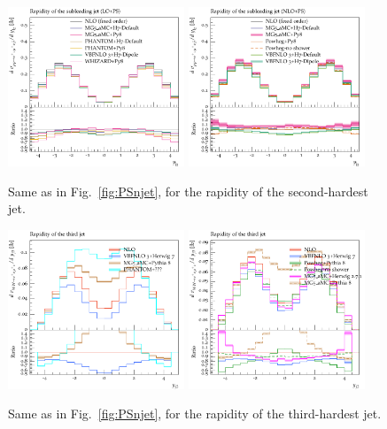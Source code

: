 \begin{figure}[hbt]
\centering
\includegraphics[width=0.47\textwidth]{figures/LOPS/y_j2.pdf}
\includegraphics[width=0.47\textwidth]{figures/NLOPS/y_j2.pdf}
\caption{Same as in Fig.~\protect\ref{fig:PSnjet}, for the rapidity of the second-hardest jet.}
\label{fig:PSy2}
\end{figure}

\begin{figure}[hbt]
\centering
\includegraphics[width=0.47\textwidth]{figures/LOPS/y_j3.pdf}
\includegraphics[width=0.47\textwidth]{figures/NLOPS/y_j3.pdf}
\caption{Same as in Fig.~\protect\ref{fig:PSnjet}, for the rapidity of the third-hardest jet.}
\label{fig:PSy3}
\end{figure}

